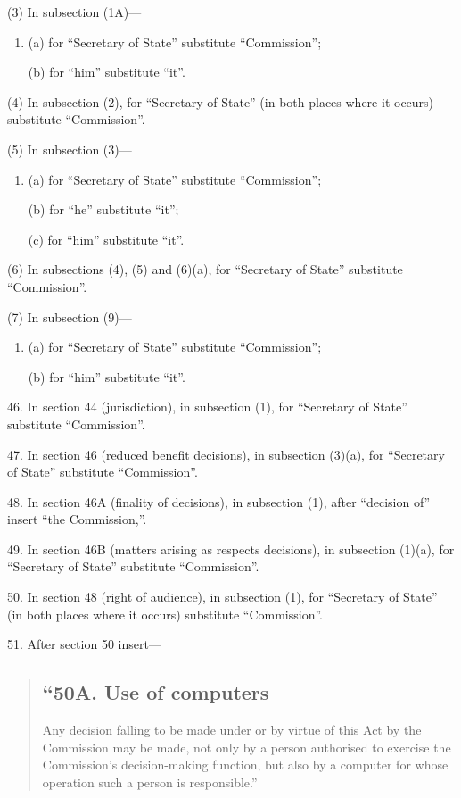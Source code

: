 \documentclass[a4paper]{article}
\begin{document}
(3) In subsection (1A)—
\begin{enumerate}\item[]
(a) for “Secretary of State” substitute “Commission”;

(b) for “him” substitute “it”.
\end{enumerate}

(4) In subsection (2), for “Secretary of State” (in both places where it occurs) substitute “Commission”.

(5) In subsection (3)—
\begin{enumerate}\item[]
(a) for “Secretary of State” substitute “Commission”;

(b) for “he” substitute “it”;

(c) for “him” substitute “it”.
\end{enumerate}

(6) In subsections (4), (5) and (6)(a), for “Secretary of State” substitute “Commission”.

(7) In subsection (9)—
\begin{enumerate}\item[]
(a) for “Secretary of State” substitute “Commission”;

(b) for “him” substitute “it”.
\end{enumerate}

\medskip

46. In section 44 (jurisdiction), in subsection (1), for “Secretary of State” substitute “Commission”.

\medskip

47. In section 46 (reduced benefit decisions), in subsection (3)(a), for “Secretary of State” substitute “Commission”.

\medskip

48. In section 46A (finality of decisions), in subsection (1), after “decision of” insert “the Commission,”.

\medskip

49. In section 46B (matters arising as respects decisions), in subsection (1)(a), for “Secretary of State” substitute “Commission”.

\medskip

50. In section 48 (right of audience), in subsection (1), for “Secretary of State” (in both places where it occurs) substitute “Commission”.

\medskip

51. After section 50 insert—
\begin{quotation}
\subsection*{“50A. Use of computers} Any decision falling to be made under or by virtue of this Act by the Commission may be made, not only by a person authorised to exercise the Commission's decision-making function, but also by a computer for whose operation such a person is responsible.”
\end{quotation}
\end{document}
